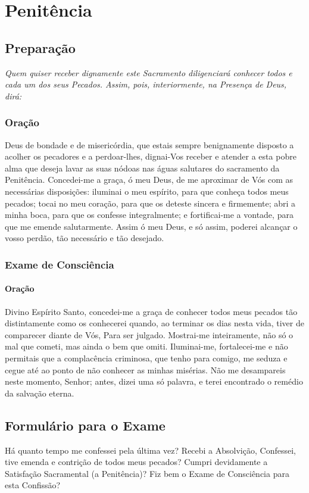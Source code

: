 \section{Penitência}

\subsection{Preparação}

\textit{Quem quiser receber dignamente este Sacramento diligenciará conhecer todos e cada um dos seus Pecados. Assim, pois, interiormente, na Presença de Deus, dirá:}

\subsubsection{Oração}
Deus de bondade e de misericórdia, que estais sempre benignamente disposto a acolher os pecadores e a perdoar-lhes, dignai-Vos receber e atender a esta pobre alma que deseja lavar as suas nódoas nas águas salutares do sacramento da Penitência. Concedei-me a graça, ó meu Deus, de me aproximar de Vós com as necessárias disposições: iluminai o meu espírito, para que conheça todos meus pecados; tocai no meu coração, para que os deteste sincera e firmemente; abri a minha boca, para que os confesse integralmente; e fortificai-me a vontade, para que me emende salutarmente. Assim ó meu Deus, e só assim, poderei alcançar o vosso perdão, tão necessário e tão desejado.

\subsubsection{Exame de Consciência}
\paragraph{Oração}
Divino Espírito Santo, concedei-me a graça de conhecer todos meus pecados tão distintamente como os conhecerei quando, ao terminar os dias nesta vida, tiver de comparecer diante de Vós, Para ser julgado. Mostrai-me inteiramente, não só o mal que cometi, mas ainda o bem que omiti. Iluminai-me, fortalecei-me e não permitais que a complacência criminosa, que tenho para comigo, me seduza e cegue até ao ponto de não conhecer as minhas misérias. Não me desampareis neste momento, Senhor; antes, dizei uma só palavra, e terei encontrado o remédio da salvação eterna.

\subsection{Formulário para o Exame}
Há quanto tempo me confessei pela última vez? Recebi a Absolvição, Confessei, tive emenda e contrição de todos meus pecados? Cumpri devidamente a Satisfação Sacramental (a Penitência)? Fiz bem o Exame de Consciência para esta Confissão?

